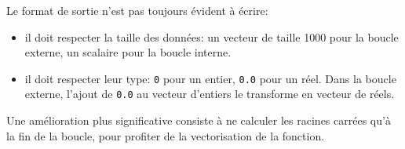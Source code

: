 \documentclass[
  12pt,
  french,
  a4paper,
  extrafontsizes,onecolumn,openright
  ]{memoir}
\newenvironment{Shaded}{\begin{snugshade}}{\end{snugshade}}
\newcommand{\AttributeTok}[1]{\textcolor[rgb]{0.13,0.29,0.53}{#1}}
\newcommand{\ControlFlowTok}[1]{\textcolor[rgb]{0.13,0.29,0.53}{\textbf{#1}}}
\newcommand{\DecValTok}[1]{\textcolor[rgb]{0.00,0.00,0.81}{#1}}
\newcommand{\FunctionTok}[1]{\textcolor[rgb]{0.13,0.29,0.53}{\textbf{#1}}}
\newcommand{\NormalTok}[1]{#1}
\newcommand{\OtherTok}[1]{\textcolor[rgb]{0.56,0.35,0.01}{#1}}
\newcommand{\SpecialCharTok}[1]{\textcolor[rgb]{0.81,0.36,0.00}{\textbf{#1}}}
\providecommand{\tightlist}{%
  \setlength{\itemsep}{0pt}\setlength{\parskip}{0pt}}
\begin{document}
\normalsize
Le format de sortie n'est pas toujours évident à écrire:

\begin{itemize}
\tightlist
\item
  il doit respecter la taille des données: un vecteur de taille 1000 pour la boucle externe, un scalaire pour la boucle interne.
\item
  il doit respecter leur type: \texttt{0} pour un entier, \texttt{0.0} pour un réel. Dans la boucle externe, l'ajout de \texttt{0.0} au vecteur d'entiers le transforme en vecteur de réels.
\end{itemize}

Une amélioration plus significative consiste à ne calculer les racines carrées qu'à la fin de la boucle, pour profiter de la vectorisation de la fonction.

\scriptsize

\begin{Shaded}
\end{Shaded}
\end{document}

